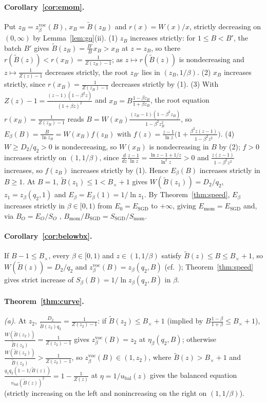 \documentclass[11pt]{article}
\begin{document}
\paragraph{Corollary~\ref{cor:emom}.} Put $z_B=z^{\mathrm{voc}}_\beta(B)$, $x_B=\tilde B(z_B)$ and $r(x)=W(x)/x$, strictly decreasing on $(0,\infty)$ by Lemma~\ref{lem:gq}(ii). (1) $z_B$ increases strictly: for $1\le B<B'$, the batch $B'$ gives $\tilde B(z_B)=\frac{B'}Bx_B>x_B$ at $z=z_B$, so there $r(\tilde B(z))<r(x_B)=\frac1{Z(z_B)-1}$; as $z\mapsto r(\tilde B(z))$ is nondecreasing and $z\mapsto\frac1{Z(z)-1}$ decreases strictly, the root $z_{B'}$ lies in $(z_B,1/\beta)$. (2) $x_B$ increases strictly, since $r(x_B)=\frac1{Z(z_B)-1}$ decreases strictly by (1). (3) With $Z(z)-1=\frac{(z-1)(1-\beta^2z)}{(1+\beta z)^2}$ and $x_B=B\frac{1-\beta z_B}{1+\beta z_B}$, the root equation $r(x_B)=\frac1{Z(z_B)-1}$ reads $B=W(x_B)\frac{(z_B-1)(1-\beta^2z_B)}{1-\beta^2z_B^2}$, so $E_\beta(B)=\frac B{\ln z_B}=W(x_B)f(z_B)$ with $f(z)=\frac{z-1}{\ln z}\big(1+\frac{\beta^2z(z-1)}{1-\beta^2z^2}\big)$. (4) $W\ge D_2/q_2>0$ is nondecreasing, so $W(x_B)$ is nondecreasing in $B$ by (2); $f>0$ increases strictly on $(1,1/\beta)$, since $\frac d{dz}\frac{z-1}{\ln z}=\frac{\ln z-1+1/z}{\ln^2z}>0$ and $\frac{z(z-1)}{1-\beta^2z^2}$ increases, so $f(z_B)$ increases strictly by (1). Hence $E_\beta(B)$ increases strictly in $B\ge1$. At $B=1$, $\tilde B(z_1)\le1<B_\times+1$ gives $W(\tilde B(z_1))=D_2/q_2$, $z_1=z_\beta(q_2,1)$ and $E_\beta=E_\beta(1)=1/\ln z_1$. By Theorem~\ref{thm:speed}, $E_\beta$ increases strictly in $\beta\in[0,1)$ from $E_0=E_{\mathrm{SGD}}$ to $+\infty$, giving $E_{\mathrm{mom}}=E_{\mathrm{SGD}}$ and, via $B_O=E_O/S_O$ \citep[Proposition~H.15]{everett2026sparse}, $B_{\mathrm{mom}}/B_{\mathrm{SGD}}=S_{\mathrm{SGD}}/S_{\mathrm{mom}}$.

\paragraph{Corollary~\ref{cor:belowbx}.} If $B-1\le B_\times$, every $\beta\in[0,1)$ and $z\in(1,1/\beta)$ satisfy $\tilde B(z)\le B\le B_\times+1$, so $W(\tilde B(z))=D_2/q_2$ and $z^{\mathrm{voc}}_\beta(B)=z_\beta(q_2,B)$ (cf.\ \citealp[Proposition~H.16(i), Lemma~H.13(v)]{everett2026sparse}); Theorem~\ref{thm:speed} gives strict increase of $S_\beta(B)=1/\ln z_\beta(q_2,B)$ in $\beta$.

\paragraph{Theorem~\ref{thm:curve}.} \emph{(a).} At $z_2$, $\frac{D_2}{\tilde B(z_2)q_2}=\frac1{Z(z_2)-1}$: if $\tilde B(z_2)\le B_\times+1$ (implied by $B\frac{1-\beta}{1+\beta}\le B_\times+1$), $\frac{W(\tilde B(z_2))}{\tilde B(z_2)}=\frac1{Z(z_2)-1}$ gives $z^{\mathrm{voc}}_\beta(B)=z_2$ at $\eta_\beta(q_2,B)$; otherwise $\frac{W(\tilde B(z_2))}{\tilde B(z_2)}>\frac1{Z(z_2)-1}$, so $z^{\mathrm{voc}}_\beta(B)\in(1,z_2)$, where $\tilde B(z)>B_\times+1$ and $\frac{q_1q_2(1-1/\tilde B(z))}{v_{\mathrm{bal}}(\tilde B(z))^2}=1-\frac1{Z(z)}$ at $\eta=1/u_{\mathrm{bal}}(z)$ gives the balanced equation (strictly increasing on the left and nonincreasing on the right on $(1,1/\beta)$).
\end{document}
